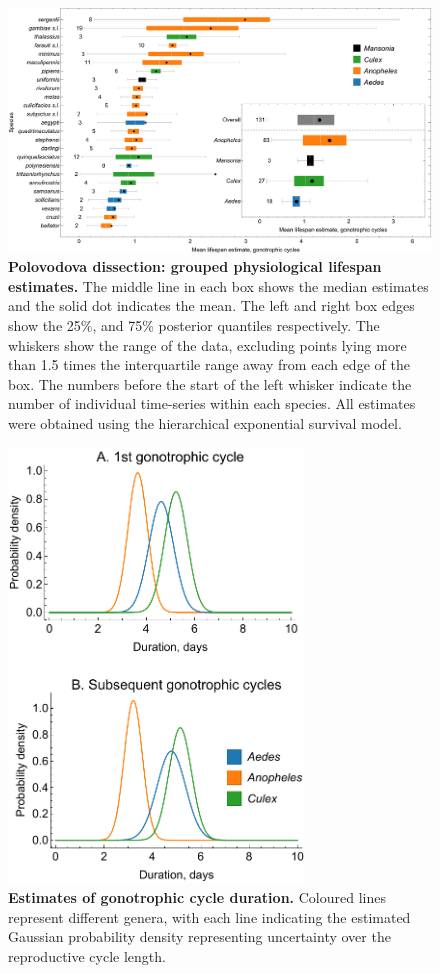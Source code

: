 \documentclass[12pt]{article}
\begin{document}
\begin{figure}[h]
	\centerline{\includegraphics[width=1\textwidth]{./Figure_files/dissection_lifetimes_exponential.pdf}}
	\caption{\textbf{Polovodova dissection: grouped physiological lifespan estimates.} The middle line in each box shows the median estimates and the solid dot indicates the mean. The left and right box edges show the 25\%, and 75\% posterior quantiles respectively. The whiskers show the range of the data, excluding points lying more than 1.5 times the interquartile range away from each edge of the box. The numbers before the start of the left whisker indicate the number of individual time-series within each species. All estimates were obtained using the hierarchical exponential survival model.}
	\label{fig:dissection_lifetimes_exponential}
\end{figure}

\begin{figure}[h]
	\centerline{\includegraphics[width=0.7\textwidth]{./Figure_files/gonotrophic_cycle_durations.pdf}}
	\caption{\textbf{Estimates of gonotrophic cycle duration.} Coloured lines represent different genera, with each line indicating the estimated Gaussian probability density representing uncertainty over the reproductive cycle length.}
	\label{fig:gonotrophic}
\end{figure}
\end{document}
